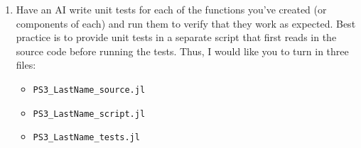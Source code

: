 \documentclass[12pt,english]{article}
\begin{document}
\begin{enumerate}
\item Have an AI write unit tests for each of the functions you've created (or components of each) and run them to verify that they work as expected. Best practice is to provide unit tests in a separate script that first reads in the source code before running the tests. Thus, I would like you to turn in three files:
    \begin{itemize}
        \item \texttt{PS3\_LastName\_source.jl}
        \item \texttt{PS3\_LastName\_script.jl}
        \item \texttt{PS3\_LastName\_tests.jl}
    \end{itemize}

\end{enumerate}
\end{document}
